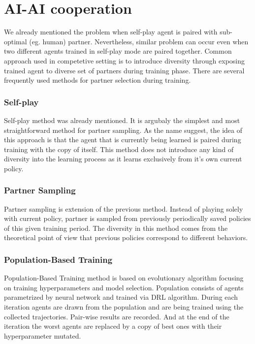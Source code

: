 \section{AI-AI cooperation}
We already mentioned the problem when self-play agent is paired with sub-optimal (eg. human) partner.
Nevertheless, similar problem can occur even when two different agents trained in self-play mode are paired together.
Common approach used in competetive setting is to introduce diversity through exposing trained agent to diverse set of partners during training phase.
There are several frequently used methods for partner selection during training.

\subsubsection*{Self-play}
Self-play method was already mentioned.
It is argubaly the simplest and most straightforward method for partner sampling.
As the name suggest, the idea of this approach is that the agent that is currently being learned is paired during training with the copy of itself.
This method does not introduce any kind of diversity into the learning process as it learns exclusively from it's own current policy.

\subsubsection*{Partner Sampling}
Partner sampling is extension of the previous method. 
Instead of playing solely with current policy, partner is sampled from previously periodically saved policies of this given training period.
The diversity in this method comes from the theoretical point of view that previous policies correspond to different behaviors.

\subsubsection*{Population-Based Training}
Population-Based Training method is based on evolutionary algorithm focusing on training hyperparameters and model selection.
Population consists of agents parametrized by neural network and trained via DRL algorithm.
During each iteration agents are drawn from the population and are being trained using the collected trajectories.
Pair-wise results are recorded.
And at the end of the iteration the worst agents are replaced by a copy of best ones with their hyperparameter mutated.

